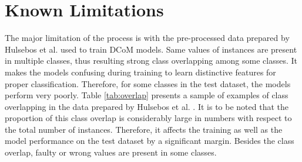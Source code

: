 \documentclass{article}
\begin{document}
\section{Known Limitations}
\label{sec:limitations}

The major limitation of the process is with the pre-processed data prepared by Hulsebos et al. \cite{Hulsebos} used to train DCoM models. Same values of instances are present in multiple classes, thus resulting strong class overlapping among some classes. It makes the models confusing during training to learn distinctive features for proper classification. Therefore, for some classes in the test dataset, the models perform very poorly. Table \ref{tab:overlap} presents a sample of examples of class overlapping in the data prepared by Hulsebos et al. \cite{Hulsebos}. It is to be noted that the proportion of this class overlap is considerably large in numbers with respect to the total number of instances. Therefore, it affects the training as well as the model performance on the test dataset by a significant margin. Besides the class overlap, faulty or wrong values are present in some classes. 
\end{document}
